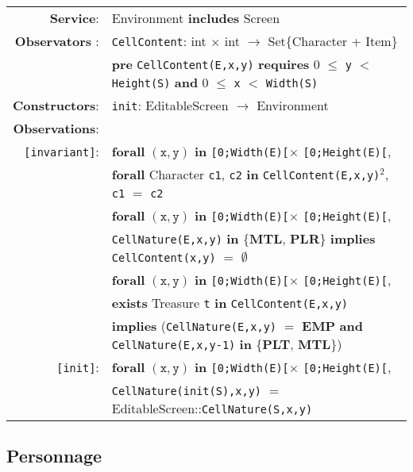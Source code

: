 \documentclass{article}
\begin{document}
\begin{tabular}{rl}
\textbf{Service}: & Environment \textbf{includes} Screen
\\ \textbf{Observators} : & \texttt{CellContent}:
\textrm{int} $\times$ \textrm{int} $\rightarrow$
\textrm{Set\{Character + Item\}} \\
& \quad \textbf{pre } \texttt{CellContent(E,x,y)} \textbf{ requires } 0 $\leq$ \texttt{y} $<$ \texttt{Height(S)} \textbf{ and } 0 $\leq$ \texttt{x} $<$ \texttt{Width(S)}\\
\textbf{Constructors}: & \texttt{init}: \textrm{EditableScreen} $\rightarrow$ \textrm{Environment} \\
\textbf{Observations}: \\
\texttt{[invariant]}: & \textbf{forall} $(\mathtt{x},\mathtt{y})$ \textbf{in} \texttt{[0;Width(E)[}$\times$ \texttt{[0;Height(E)[},~\\ & \quad\quad \textbf{forall} \textrm{Character} \texttt{c1}, \texttt{c2} \textbf{in} \texttt{CellContent(E,x,y)}$^2$, \texttt{c1} $=$ \texttt{c2} \\
& \textbf{forall} $(\mathtt{x},\mathtt{y})$ \textbf{in} \texttt{[0;Width(E)[}$\times$ \texttt{[0;Height(E)[},~\\ & \quad\quad \texttt{CellNature(E,x,y)} \textbf{in} \{\textbf{MTL}, \textbf{PLR}\} \textbf{implies} \texttt{CellContent(x,y)} $=$ $\emptyset$  \\
& \textbf{forall} $(\mathtt{x},\mathtt{y})$ \textbf{in} \texttt{[0;Width(E)[}$\times$ \texttt{[0;Height(E)[},~\\ & \quad\quad \textbf{exists} \textrm{Treasure} \texttt{t} \textbf{in} \texttt{CellContent(E,x,y)}  \\ & \quad\quad \textbf{implies} (\texttt{CellNature(E,x,y)} $=$ \textbf{EMP} \textbf{and} \texttt{CellNature(E,x,y-1)} \textbf{in} \{\textbf{PLT}, \textbf{MTL}\})\\
                        \texttt{[init]}: & \textbf{forall} $(\mathtt{x},\mathtt{y})$ \textbf{in} \texttt{[0;Width(E)[}$\times$ \texttt{[0;Height(E)[},~\\ & \quad\quad
                                \texttt{CellNature(init(S),x,y)} $=$ \textrm{EditableScreen}::\texttt{CellNature(S,x,y)} \\

                        
\end{tabular}

\subsection*{Personnage}
\end{document}
